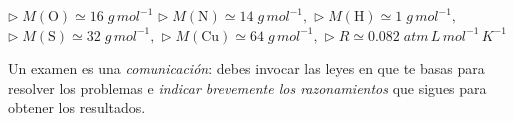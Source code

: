 \documentclass[a4paper,addpoints,14pt]{exam}
\newcommand*\chem[1]{\ensuremath{\mathrm{#1}}}
\begin{document}

\vspace*{\fill}

\hspace*{1cm}\begin{learn}
{$\triangleright\; M(\chem{O})\simeq16\;g\,mol^{-1}$\newline
$\triangleright\; M(\chem{N})\simeq14\;g\,mol^{-1},$\newline
$\triangleright\; M(\chem{H})\simeq1\;g\,mol^{-1},$\newline
$\triangleright\; M(\chem{S})\simeq32\;g\,mol^{-1},$\newline
$\triangleright\; M(\chem{Cu})\simeq64\;g\,mol^{-1},$\newline
$\triangleright\; R\simeq 0.082\;atm\,L\,mol^{-1}\,K^{-1}$}
\end{learn}	



\newpage
\vspace*{-1cm}

\begin{problemas}{Un examen es una \textit{comunicación}: debes invocar las leyes en que te basas para resolver los problemas e \textit{indicar brevemente los razonamientos} que sigues para obtener los resultados.}
\end{problemas}
\vspace{1ex}

\end{document}
